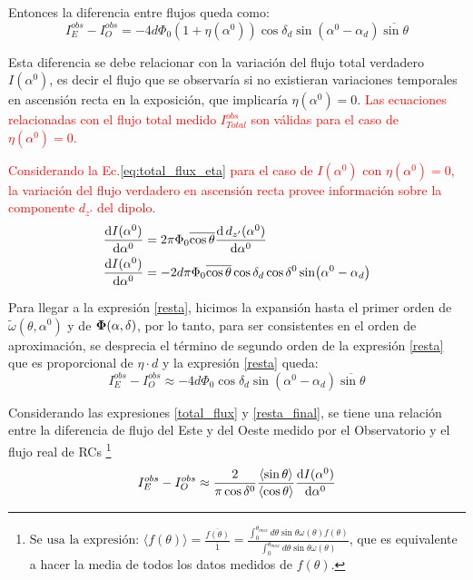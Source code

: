      Entonces la diferencia entre flujos queda como:
    \begin{equation}
        I^{obs}_E -  I^{obs}_O =-4d \Phi_0 (1+ \eta(\alpha^0)) \cos\delta_d \sin(\alpha^0  - \alpha_d)\overline{\sin\theta}
        \label{resta}
    \end{equation}

    Esta diferencia se debe relacionar con la variación del flujo total verdadero $I(\alpha^0)$, es decir el flujo que se observaría si no existieran variaciones temporales en ascensión recta en la exposición, que implicaría $\eta(\alpha^0)=0$. \textcolor{red}{Las ecuaciones relacionadas con el flujo total medido $I^{obs}_{Total}$ son válidas para el caso de $\eta(\alpha^0)=0$.}

  \textcolor{red}{  Considerando la Ec.\ref{eq:total_flux_eta} para el caso de $I(\alpha^0)$ con $\eta(\alpha^0)=0$, la variación del flujo verdadero en ascensión recta provee información sobre la componente $d_{z'}$ del dipolo.} 
    \begin{align}
        \dv{I(\alpha^0)}{\alpha^0}  & = 2\pi\Phi_0 \overline{\cos\theta} \dv{\,d_{z'}(\alpha^0) }{\alpha^0}\\ 
        \dv{I(\alpha^0)}{\alpha^0} &= -2d\pi\Phi_0 \overline{\cos\theta}\cos\delta_d \cos\delta^0 \sin(\alpha^0 - \alpha_d) \label{total_flux}
    \end{align}

    Para llegar a la expresión \ref{resta}, hicimos la expansión hasta el primer orden de $\tilde{\omega}(\theta, \alpha^0)$ y de $\bf\Phi(\alpha, \delta)$, por lo tanto, para ser consistentes en el orden de aproximación, se desprecia el término de segundo orden de la expresión \ref{resta} que es proporcional de $\eta \cdot d$ y la expresión \ref{resta} queda:
        \begin{equation}
            I^{obs}_E -  I^{obs}_O \approx -4d \Phi_0 \cos\delta_d \sin(\alpha^0  - \alpha_d)\overline{\sin\theta}
            \label{resta_final}
        \end{equation}

    Considerando las expresiones \ref{total_flux} y \ref{resta_final}, se tiene una relación entre la diferencia de flujo del Este y del Oeste medido por el Observatorio  y el flujo real de RCs \footnote{
    $
        \text{Se usa la expresión:  }
        \langle f(\theta) \rangle = \frac{\overline{f(\theta)}}{\overline{1}} = \displaystyle\frac{\int_{0}^{\theta_{max}} d \theta \sin\theta \omega(\theta) f(\theta) }{\int_{0}^{\theta_{max}} d \theta \sin\theta \omega(\theta)} 
    $,  
    que es equivalente a hacer la media  de todos los datos medidos de $f(\theta)$.} %
    \begin{equation}
        I^{obs}_E -  I^{obs}_O \approx  \frac{2}{\pi \cos \delta^0} \frac{\langle\sin\theta \rangle}{\langle\cos\theta \rangle}\dv{I(\alpha^0)}{\alpha^0} 
        \label{eq:final}
    \end{equation}
   

